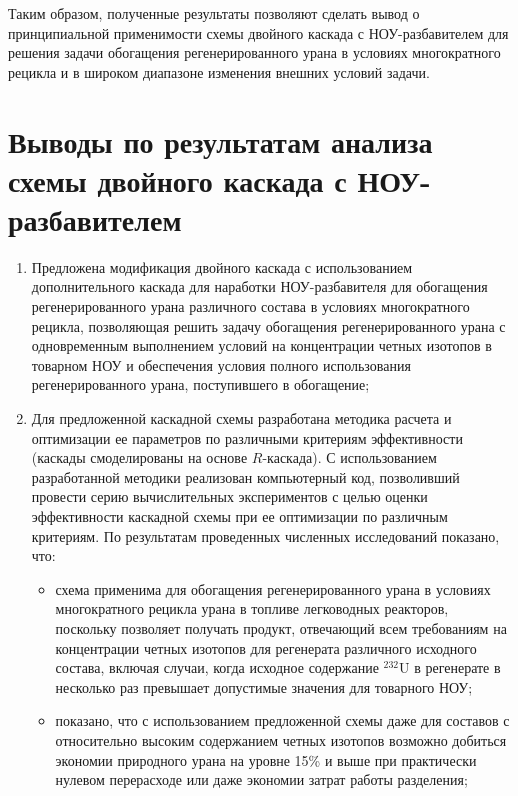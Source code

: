 
Таким образом, полученные результаты позволяют сделать вывод о принципиальной применимости схемы двойного каскада с НОУ-разбавителем для решения задачи обогащения регенерированного урана в условиях многократного рецикла и в широком диапазоне изменения внешних условий задачи.    

\section{Выводы по результатам анализа схемы двойного каскада с НОУ-разбавителем}

\begin{enumerate}
    \item Предложена модификация двойного каскада с использованием дополнительного каскада для наработки НОУ-разбавителя для обогащения регенерированного урана различного состава в условиях многократного рецикла, позволяющая решить задачу обогащения регенерированного урана с одновременным выполнением условий на концентрации четных изотопов в товарном НОУ и обеспечения условия полного использования регенерированного урана, поступившего в обогащение;
    \item Для предложенной каскадной схемы разработана методика расчета и оптимизации ее параметров по различными критериям эффективности (каскады смоделированы на основе $R$-каскада). С использованием разработанной методики реализован компьютерный код, позволивший провести серию вычислительных экспериментов с целью оценки эффективности каскадной схемы при ее оптимизации по различным критериям. По результатам проведенных численных исследований показано, что:
    \begin{itemize}
        \item схема применима для обогащения регенерированного урана в условиях многократного рецикла урана в топливе легководных реакторов, поскольку позволяет получать продукт, отвечающий всем требованиям на концентрации четных изотопов для регенерата различного исходного состава, включая случаи, когда исходное содержание $^{232}$U в регенерате в несколько раз превышает допустимые значения для товарного НОУ;
        \item показано, что с использованием предложенной схемы даже для составов с относительно высоким содержанием четных изотопов возможно добиться экономии природного урана на уровне 15\% и выше при практически нулевом перерасходе или даже экономии затрат работы разделения;

\end{itemize}
\end{enumerate}
